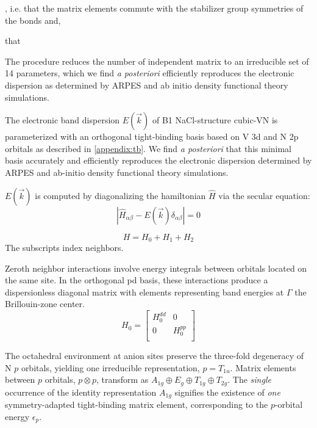\documentclass[twocolumn,showpacs,preprintnumbers,superscriptaddress,prb,floatfix,aps,10pt]{revtex4-1}
\newcommand*{\ham}{\hat{H}}
\begin{document}
, i.e. that the matrix elements commute with the stabilizer group symmetries of the bonds and,

 that 

The procedure reduces the number of independent matrix to an irreducible set of 14 parameters, which we find \emph{a posteriori} efficiently reproduces the electronic dispersion as determined by ARPES and ab initio density functional theory simulations.

The electronic band dispersion $E(\vec{k})$ of B1 NaCl-structure cubic-VN is parameterized with an orthogonal tight-binding basis based on V 3d and N 2p orbitals as described in \ref{appendix:tb}. We find \emph{a posteriori} that this minimal basis accurately and efficiently reproduces the electronic dispersion determined by ARPES and ab-initio density functional theory simulations.

$E(\vec{k})$ is computed by diagonalizing the hamiltonian $\ham$ via the secular equation:
\begin{equation}
\left| \ham_{\alpha\beta} - E(\vec{k}) \delta_{\alpha\beta} \right| = 0
\end{equation}



\begin{equation}
H = H_0 + H_1 + H_2
\end{equation}
The subscripts index neighbors.




Zeroth neighbor interactions involve energy integrals between orbitals located on the same site. In the orthogonal pd basis, these interactions produce a dispersionless diagonal matrix with elements representing band energies at $\Gamma$ the Brillouin-zone center. 
\begin{equation}
H_0 =
\begin{bmatrix}
H_0^{dd} & 0 \\
 0 & H_0^{pp} \\
\end{bmatrix}
\end{equation}

The octahedral environment at anion sites preserve the three-fold degeneracy of N $p$ orbitals, yielding one irreducible representation, $p = T_{1u}$. Matrix elements between $p$ orbitals, $p \otimes p$, transform as $A_{1g} \oplus E_g \oplus T_{1g} \oplus T_{2g}$. The \emph{single} occurrence of the identity representation $A_{1g}$ signifies the existence of \emph{one} symmetry-adapted tight-binding matrix element, corresponding to the $p$-orbital energy $\epsilon_p$.
\end{document}
